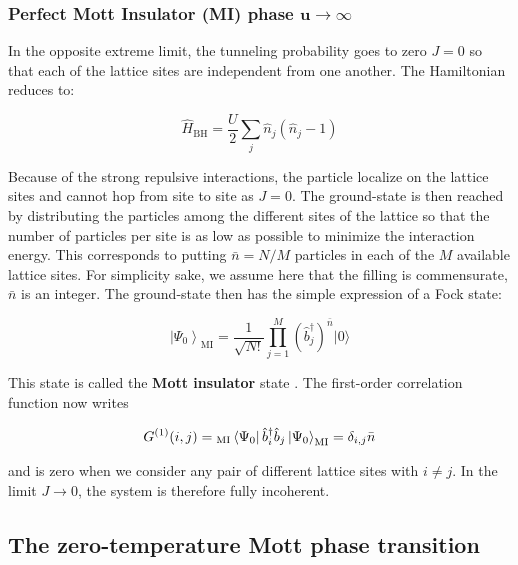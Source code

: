 \subsubsection{Perfect Mott Insulator (MI) phase $\bm{u \to \infty}$}

In the opposite extreme limit, the tunneling probability goes to zero $J=0$ so that each of the lattice sites are independent from one another. The Hamiltonian reduces to:

\begin{equation}
    \hat{H}_{\mathrm{BH}} = \frac{U}{2} \sum_j \hat{n}_j (\hat{n}_j -1)
\end{equation}

Because of the strong repulsive interactions, the particle localize on the lattice sites and cannot hop from site to site as $J=0$. The ground-state is then reached by distributing the particles among the different sites of the lattice so that the number of particles per site is as low as possible to minimize the interaction energy. This corresponds to putting $\bar{n}=N/M$ particles in each of the $M$ available lattice sites. For simplicity sake, we assume here that the filling is commensurate, \ie $\bar{n}$ is an integer. The ground-state then has the simple expression of a Fock state:

\begin{equation}
    \left|\Psi_{0}\right\rangle_{\mathrm{MI}}=\frac{1}{\sqrt{N !}} \prod_{j=1}^{M}\left(\hat{b}_{j}^{\dagger}\right)^{\bar{n}}|0\rangle
    \label{eq:ground-state_MI}
\end{equation}

\noindent This state is called the \textbf{Mott insulator} state \cite{fisher1989boson}. The first-order correlation function now writes

\begin{equation}
     G^{(1)}(i,j)= {}_{\mathrm{MI}} \bra{\Psi_0} \hat{b}^{\dagger}_i \hat{b}_j \ket{\Psi_0}_{\mathrm{MI}} = \delta_{i,j} \bar{n}
\end{equation}

\noindent and is zero when we consider any pair of different lattice sites with $i \neq j$. In the limit $J \to 0$, the system is therefore fully incoherent.



\subsection{The zero-temperature Mott phase transition}

